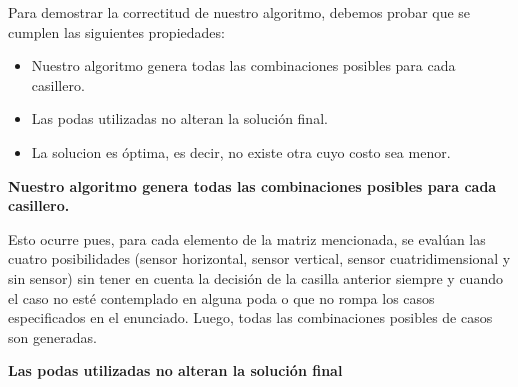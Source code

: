 Para demostrar la correctitud de nuestro algoritmo, debemos probar que se cumplen las siguientes propiedades:
\begin{itemize}
\item Nuestro algoritmo genera todas las combinaciones posibles para cada casillero.
\item Las podas utilizadas no alteran la solución final.
\item La solucion es óptima, es decir, no existe otra cuyo costo sea menor.
\end{itemize}

\newline

\textbf{Nuestro algoritmo genera todas las combinaciones posibles para cada casillero.} \newline

Esto ocurre pues, para cada elemento de la matriz mencionada, se evalúan las cuatro posibilidades (sensor horizontal, sensor vertical, sensor cuatridimensional y sin sensor) sin tener en cuenta la decisión de la casilla anterior siempre y cuando el caso no esté contemplado en alguna poda o que no rompa los casos especificados en el enunciado. Luego, todas las combinaciones posibles de casos son generadas.\newline
\newline 

\textbf{Las podas utilizadas no alteran la solución final} \newline

